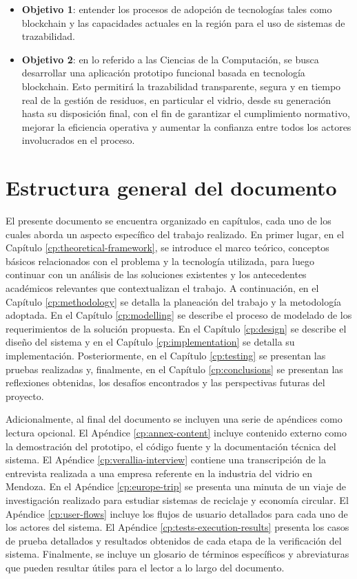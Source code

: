 \begin{itemize}
	\item \textbf{Objetivo 1}: entender los procesos de adopción de tecnologías tales como blockchain y las capacidades actuales en la región para el uso de sistemas de trazabilidad.
	\item \textbf{Objetivo 2}: en lo referido a las Ciencias de la Computación, se busca desarrollar una aplicación prototipo funcional basada en tecnología blockchain. Esto permitirá la trazabilidad transparente, segura y en tiempo real de la gestión de residuos, en particular el vidrio, desde su generación hasta su disposición final, con el fin de garantizar el cumplimiento normativo, mejorar la eficiencia operativa y aumentar la confianza entre todos los actores involucrados en el proceso.
\end{itemize}

\section{Estructura general del documento}

El presente documento se encuentra organizado en capítulos, cada uno de los cuales aborda un aspecto específico del trabajo realizado. En primer lugar, en el Capítulo \ref{cp:theoretical-framework}, se introduce el marco teórico, conceptos básicos relacionados con el problema y la tecnología utilizada, para luego continuar con un análisis de las soluciones existentes y los antecedentes académicos relevantes que contextualizan el trabajo. A continuación, en el Capítulo \ref{cp:methodology} se detalla la planeación del trabajo y la metodología adoptada. En el Capítulo \ref{cp:modelling} se describe el proceso de modelado de los requerimientos de la solución propuesta. En el Capítulo \ref{cp:design} se describe el diseño del sistema y en el Capítulo \ref{cp:implementation} se detalla su implementación. Posteriormente, en el Capítulo \ref{cp:testing} se presentan las pruebas realizadas y, finalmente, en el Capítulo \ref{cp:conclusions} se presentan las reflexiones obtenidas, los desafíos encontrados y las perspectivas futuras del proyecto.

Adicionalmente, al final del documento se incluyen una serie de apéndices como lectura opcional. El Apéndice \ref{cp:annex-content} incluye contenido externo como la demostración del prototipo, el código fuente y la documentación técnica del sistema. El Apéndice \ref{cp:verallia-interview} contiene una transcripción de la entrevista realizada a una empresa referente en la industria del vidrio en Mendoza. En el Apéndice \ref{cp:europe-trip} se presenta una minuta de un viaje de investigación realizado para estudiar sistemas de reciclaje y economía circular. El Apéndice \ref{cp:user-flows} incluye los flujos de usuario detallados para cada uno de los actores del sistema. El Apéndice \ref{cp:tests-execution-results} presenta los casos de prueba detallados y resultados obtenidos de cada etapa de la verificación del sistema. Finalmente, se incluye un glosario de términos específicos y abreviaturas que pueden resultar útiles para el lector a lo largo del documento.